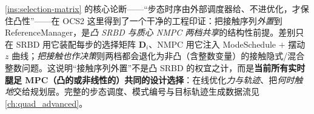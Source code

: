 \begin{insight}[ReferenceManager $=$“凸/可解的前提”的工业级实例]\label{ins:mpc-refmgr}
\cref{ins:selection-matrix} 的核心论断——“步态时序由外部调度器给、不进优化，才保住凸性”——在 OCS2 这里得到了一个干净的工程印证：把接触序列\emph{外置}到 ReferenceManager，是\emph{凸 SRBD 与质心 NMPC 两档共享}的结构性前提。差别只在 SRBD 用它装配每步的选择矩阵 $\mathbf{D}_i$、NMPC 用它注入 ModeSchedule $+$ 摆动 $z$ 曲线；\emph{把接触也作决策}则两档都会退化为非凸（含整数变量）的接触隐式/混合整数问题。这说明“接触序列外置”不是凸 SRBD 的权宜之计，而是\textbf{当前所有实时腿足 MPC（凸的或非线性的）共同的设计选择}：在线优化\emph{力与轨迹}、把\emph{何时触地}交给规划层。完整的步态调度、模式编号与目标轨迹生成数据流见 \cref{ch:quad_advanced}。
\end{insight}

